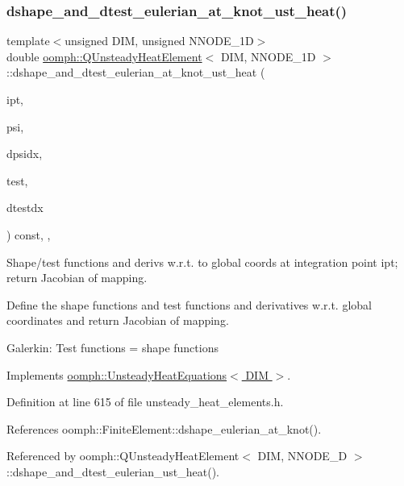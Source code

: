 \subsubsection{\texorpdfstring{dshape\+\_\+and\+\_\+dtest\+\_\+eulerian\+\_\+at\+\_\+knot\+\_\+ust\+\_\+heat()}{dshape\_and\_dtest\_eulerian\_at\_knot\_ust\_heat()}}
{\footnotesize\ttfamily template$<$unsigned D\+IM, unsigned N\+N\+O\+D\+E\+\_\+1D$>$ \\
double \hyperlink{classoomph_1_1QUnsteadyHeatElement}{oomph\+::\+Q\+Unsteady\+Heat\+Element}$<$ D\+IM, N\+N\+O\+D\+E\+\_\+1D $>$\+::dshape\+\_\+and\+\_\+dtest\+\_\+eulerian\+\_\+at\+\_\+knot\+\_\+ust\+\_\+heat (\begin{DoxyParamCaption}\item[{const unsigned \&}]{ipt,  }\item[{\hyperlink{classoomph_1_1Shape}{Shape} \&}]{psi,  }\item[{\hyperlink{classoomph_1_1DShape}{D\+Shape} \&}]{dpsidx,  }\item[{\hyperlink{classoomph_1_1Shape}{Shape} \&}]{test,  }\item[{\hyperlink{classoomph_1_1DShape}{D\+Shape} \&}]{dtestdx }\end{DoxyParamCaption}) const\hspace{0.3cm}{\ttfamily [inline]}, {\ttfamily [protected]}, {\ttfamily [virtual]}}



Shape/test functions and derivs w.\+r.\+t. to global coords at integration point ipt; return Jacobian of mapping. 

Define the shape functions and test functions and derivatives w.\+r.\+t. global coordinates and return Jacobian of mapping.

Galerkin\+: Test functions = shape functions 

Implements \hyperlink{classoomph_1_1UnsteadyHeatEquations_aa6ab5a2e2bbf3830dfb17f8f2d1281b0}{oomph\+::\+Unsteady\+Heat\+Equations$<$ D\+I\+M $>$}.



Definition at line 615 of file unsteady\+\_\+heat\+\_\+elements.\+h.



References oomph\+::\+Finite\+Element\+::dshape\+\_\+eulerian\+\_\+at\+\_\+knot().



Referenced by oomph\+::\+Q\+Unsteady\+Heat\+Element$<$ D\+I\+M, N\+N\+O\+D\+E\+\_\+D $>$\+::dshape\+\_\+and\+\_\+dtest\+\_\+eulerian\+\_\+ust\+\_\+heat().

